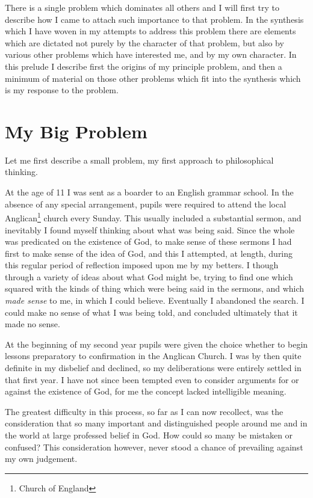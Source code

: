 {There is a single problem which dominates all others and I will first try to describe how I came to attach such importance to that problem.
In the synthesis which I have woven in my attempts to address this problem there are elements which are dictated not purely by the character of that problem, but also by various other problems which have interested me, and by my own character.
In this prelude I describe first the origins of my principle problem, and then a minimum of material on those other problems which fit into the synthesis which is my response to the problem.

\section{My Big Problem}

Let me first describe a small problem, my first approach to philosophical thinking.

At the age of 11 I was sent as a boarder to an English grammar school.
In the absence of any special arrangement, pupils were required to attend the local Anglican\footnote{
Church of England} church every Sunday.
This usually included a substantial sermon, and inevitably I found myself thinking about what was being said.
Since the whole was predicated on the existence of God, to make sense of these sermons I had first to make sense of the idea of God, and this I attempted, at length, during this regular period of reflection imposed upon me by my betters.
I though through a variety of ideas about what God might be, trying to find one which squared with the kinds of thing which were being said in the sermons, and which {\it made sense} to me, in which I could believe.
Eventually I abandoned the search.
I could make no sense of what I was being told, and concluded ultimately that it made no sense.

At the beginning of my second year pupils were given the choice whether to begin lessons preparatory to confirmation in the Anglican Church.
I was by then quite definite in my disbelief and declined, so my deliberations were entirely settled in that first year.
I have not since been tempted even to consider arguments for or against the existence of God, for me the concept lacked intelligible meaning.

The greatest difficulty in this process, so far as I can now recollect, was the consideration that so many important and distinguished people around me and in the world at large professed belief in God.
How could so many be mistaken or confused?
This consideration however, never stood a chance of prevailing against my own judgement.

}
